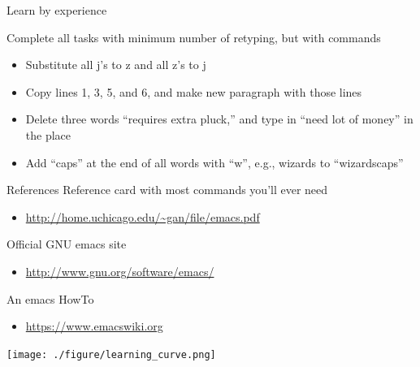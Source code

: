 \documentclass[newPxFont,sthlmFooter,nooffset]{beamer}
\begin{document}
\begin{frame}[containsverbatim,t]{Learn by experience}




Complete all tasks with minimum number of retyping, but with commands
\begin{itemize}
\item Substitute all j's to z and all z's to j
\item Copy lines 1, 3, 5, and 6, and make new paragraph with those lines
\item Delete three words ``requires extra pluck,'' and type in ``need lot of money'' in the place
\item Add ``caps'' at the end of all words with ``w'', e.g., wizards to ``wizardscaps''
\end{itemize}


\end{frame}

\begin{frame}[t]{References}
Reference card with most commands you’ll ever need
\begin{itemize}
\item \url{http://home.uchicago.edu/~gan/file/emacs.pdf}
\end{itemize}
\bigskip
Official GNU emacs site
\begin{itemize}
\item \url{http://www.gnu.org/software/emacs/}
\end{itemize}

\bigskip
An emacs HowTo
\begin{itemize}
\item \url{https://www.emacswiki.org}
\end{itemize}
\vspace{-2em}
\hfill
\texttt{[image: ./figure/learning\_curve.png]}
\end{frame}

\end{document}
